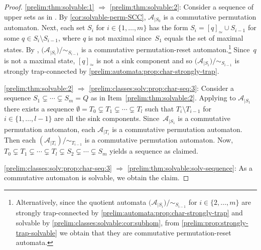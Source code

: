 \begin{proof}
\ref{prelim:thm:solvable:1} $\Rightarrow$ \ref{prelim:thm:solvable:2}:
Consider a sequence of upper sets
as in .
By \cref{cor:solvable-perm-SCC}, $\mathcal A_{|S_0}$ is a commutative permutation automaton.
Next, each set $S_i$ for $i \in \{1,\ldots, m\}$
has the form $S_i = [q]_{\simeq} \cup S_{i-1}$
for some $q \in S_i \setminus S_{i-1}$, where $q$
is not maximal since~$S_1$ equals the set of maximal states.
By ,
$\mathcal ( \mathcal A_{|S_i} ) / {\sim_{S_{i-1}}}$ is a commutative permutation-reset automaton.\footnote{Alternatively, 
since the quotient automata
$\mathcal ( \mathcal A_{|S_i} ) / {\sim_{S_{i-1}}}$ for $i \in \{2,\ldots,m\}$
are strongly trap-connected by \cref{prelim:automata:prop:char-strongly-trap}
and solvable by \cref{prelim:classes:solvable:cor:subhom},
from \cref{prelim:prop:strongly-trap-solvable} we obtain 
that they are commutative permutation-reset automata.}
Since~$q$ is not a maximal state, $[q]_{\simeq}$
is not a sink component
and so $\mathcal ( \mathcal A_{|S_i} ) / {\sim_{S_{i-1}}}$
is strongly trap-connected by \cref{prelim:automata:prop:char-strongly-trap}.

\ref{prelim:thm:solvable:2} $\Rightarrow$ \ref{prelim:classes:solv:prop:char-seq:3}:
Consider a sequence $S_1 \subsetneq \cdots \subsetneq S_m = Q$
as in Item~\ref{prelim:thm:solvable:2}.
Applying  
to $\mathcal A_{|S_1}$
there exists a sequence $\emptyset = T_0 \subsetneq T_1 \subsetneq \cdots \subsetneq T_l$
such that $T_i \setminus T_{i-1}$ for $i \in \{1,\ldots,l-1\}$
are all the sink components.
Since~$\mathcal A_{|S_1}$ is a commutative permutation automaton,
each $\mathcal A_{|T_i}$ is a commutative permutation automaton.
Then each $( \mathcal A_{|T_i} ) / {\sim_{T_{i-1}}}$ is a commutative permutation automaton.
Now, $T_0 \subsetneq T_1 \subsetneq \cdots \subsetneq T_{l} \subsetneq S_2 \subsetneq \cdots \subsetneq S_m$
yields a sequence as claimed.

\ref{prelim:classes:solv:prop:char-seq:3} $\Rightarrow$ \ref{prelim:thm:solvable:solv-sequence}:
As a commutative automaton is solvable, we obtain the claim.


\end{proof}
